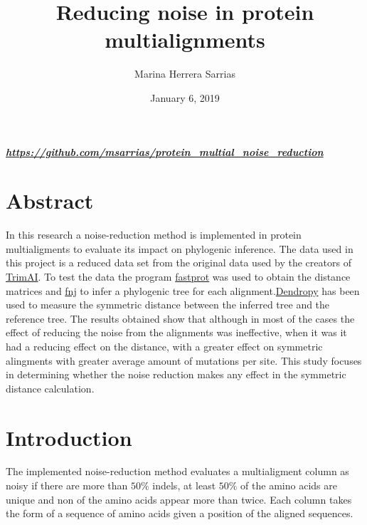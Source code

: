 \documentclass[12pt]{article}
\begin{document}
\begin{titlepage}
	
\title{\vspace{60mm}Reducing noise in protein multialignments}
\subparagraph{\url{https://github.com/msarrias/protein_multial_noise_reduction}}
\author{Marina Herrera Sarrias}
\date{January 6, 2019}


\clearpage\maketitle
\thispagestyle{empty}
\end{titlepage}


\section*{Abstract}

In this research a noise-reduction method is implemented in protein multialigments to evaluate its impact on phylogenic inference. The data used in this project is a reduced data set from the  original data used by the creators of \href{http://trimal.cgenomics.org}{TrimAI}. To test the data the program \href{http://fastphylo.sourceforge.net/}{fastprot} was used to obtain the distance matrices and \href{http://fastphylo.sourceforge.net/}{fnj} to infer a phylogenic tree for each alignment.\href{https://dendropy.org/}{Dendropy} has been used to measure the symmetric distance between the inferred tree and the reference tree. The results obtained show that although in most of the cases the effect of reducing the noise from the alignments was ineffective, when it was it had a reducing effect on the distance, with a greater effect on symmetric alingments with greater average amount of mutations per site.  This study focuses in determining whether the noise reduction makes any effect in the symmetric distance calculation. 

\clearpage
	
\tableofcontents
\clearpage

\section{Introduction}

The implemented noise-reduction method evaluates a multialigment column as noisy if there are more than $50\%$ indels, at least $50\%$ of the amino acids are unique and non of the amino acids appear more than twice. Each column takes the form of a sequence of amino acids given a position of the aligned sequences.
\end{document}

